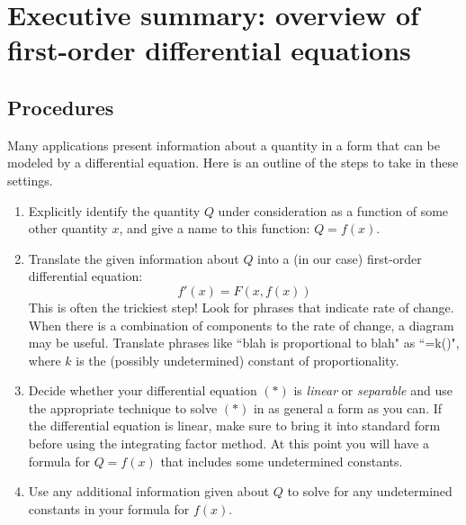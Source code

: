 \newpage

\section{Executive summary: overview of first-order differential equations}

\thispagestyle{fancy}

\subsection*{Procedures}
\begin{namedtheorem} Many applications present information about a quantity in a form that can be modeled by a differential equation. Here is an outline of the steps to take in these settings.
  \begin{enumerate}
    \item Explicitly identify the quantity $Q$ under consideration as a function of some other quantity $x$, and give a name to this function: $Q=f(x)$.
    \item Translate the given information about $Q$ into a (in our case) first-order differential equation:
    \[
    f'(x)=F(x, f(x)) \tag{$*$}
    \]
    This is often the trickiest step! Look for phrases that indicate rate of change. When there is a combination of components to the rate of change, a diagram may be useful. Translate phrases like ``blah is proportional to blah" as ``=k()", where $k$ is the (possibly undetermined) constant of proportionality.
    \item Decide whether your differential equation $(*)$ is {\em linear} or {\em separable} and use the appropriate technique to solve $(*)$ in as general a form as you can. If the differential equation is linear, make sure to bring it into standard form before using the integrating factor method. At this point you will have a formula for $Q=f(x)$ that includes some undetermined constants.
    \item Use any additional information given about $Q$ to solve for any undetermined constants in your formula for $f(x)$.
  \end{enumerate}

\end{namedtheorem}
